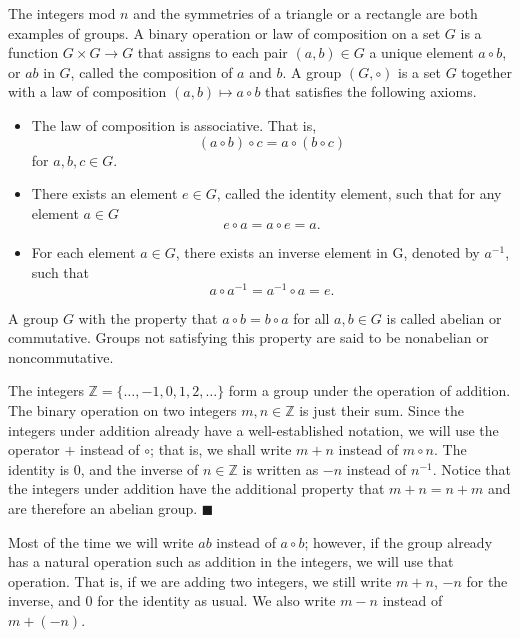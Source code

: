 The integers mod $n$ and the symmetries of a triangle or a rectangle are both examples of groups.  A {\bfi binary operation\/} or {\bfi law of composition\/} on a set $G$ is a function $G \times G \rightarrow G$ that assigns to each pair $(a,b) \in G$ a unique element $a \circ b$, or $ab$ in $G$, called the composition of $a$ and $b$.  A {\bfi group} $(G, \circ )$ is a set $G$ together with a law of composition $(a,b) \mapsto a \circ b$ that satisfies the following axioms. 
\begin{itemize}
 
\item
The law of composition is {\bfi associative}. That is,
$$
(a \circ b) \circ c = a \circ (b \circ c)
$$
for $a, b, c \in G$.
 
\item
There exists an element $e \in G$, called the {\bfi identity element}, such that for any element $a \in G$ 
$$
e \circ a = a \circ e = a.
$$
 
\item
For each element $a \in G$, there exists an {\bfi inverse element\/} in G, denoted by $a^{-1}$, such that 
$$
a \circ a^{-1} = a^{-1} \circ a = e.
$$
\end{itemize}
A group $G$ with the property that $a \circ b = b \circ a$ for all $a, b \in G$ is called {\bfi abelian\/} or {\bfi commutative}.  Groups not satisfying this property are said to be  {\bfi nonabelian\/} or {\bfi noncommutative}.  

\medskip

The integers ${\mathbb Z } = \{ \ldots , -1, 0, 1, 2, \ldots \}$ form a group under the operation of addition.  The binary operation on two integers $m, n \in {\mathbb Z}$ is just their sum.  Since the integers under addition already have a well-established notation, we will use the operator $+$ instead of $\circ$; that is, we shall write $m + n$ instead of $m \circ n$.  The identity is 0, and the inverse of $n \in {\mathbb Z}$ is written as $-n$ instead of $n^{-1}$.  Notice that the integers under addition have the additional property that $m + n = n + m$ and are therefore an abelian group.   
\hspace{\fill} $\blacksquare$

\medskip

Most of the time we will write $ab$ instead of $a \circ b$; however, if the group already has a natural operation such as addition in the integers, we will use that operation.  That is, if we are adding two integers, we still write $m + n$, $-n$ for the inverse, and 0 for the identity as usual. We also write $m - n$ instead of $m + (-n)$.

